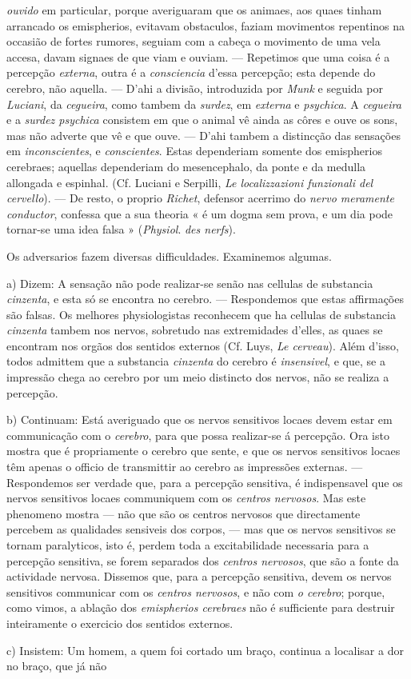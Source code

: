 \emph{ouvido} em particular, porque averiguaram que os animaes, aos quaes tinham arrancado os emispherios, evitavam obstaculos, faziam movimentos repentinos na occasião de fortes rumores, seguiam com a cabeça o movimento de uma vela accesa, davam signaes de que viam e ouviam. --- Repetimos que uma coisa é a percepção \emph{externa}, outra é a \emph{consciencia} d'essa percepção; esta depende do cerebro, não aquella. --- D'ahi a divisão, introduzida por \emph{Munk} e seguida por \emph{Luciani}, da \emph{cegueira}, como tambem da \emph{surdez}, em \emph{externa} e \emph{psychica}. A \emph{cegueira} e a \emph{surdez psychica} consistem em que o animal vê ainda as côres e ouve os sons, mas não adverte que vê e que ouve. --- D'ahi tambem a distincção das sensações em \emph{inconscientes}, e \emph{conscientes}. Estas dependeriam somente dos emispherios cerebraes; aquellas dependeriam do mesencephalo, da ponte e da medulla allongada e espinhal. (Cf. Luciani e Serpilli, \emph{Le localizzazioni funzionali del cervello}). --- De resto, o proprio \emph{Richet}, defensor acerrimo do \emph{nervo meramente conductor}, confessa que a sua theoria « é um dogma sem prova, e um dia pode tornar-se uma idea falsa » (\emph{Physiol}. \emph{des nerfs}).\par Os adversarios fazem diversas difficuldades. Examinemos algumas.\par a) Dizem: A sensação não pode realizar-se senão nas cellulas de substancia \emph{cinzenta}, e esta só se encontra no cerebro. --- Respondemos que estas affirmações são falsas. Os melhores physiologistas reconhecem que ha cellulas de substancia \emph{cinzenta} tambem nos nervos, sobretudo nas extremidades d'elles, as quaes se encontram nos orgãos dos sentidos externos (Cf. Luys, \emph{Le cerveau}). Além d'isso, todos admittem que a substancia \emph{cinzenta} do cerebro é \emph{insensivel}, e que, se a impressão chega ao cerebro por um meio distincto dos nervos, não se realiza a percepção.\par b) Continuam: Está averiguado que os nervos sensitivos locaes devem estar em communicação com o \emph{cerebro}, para que possa realizar-se á percepção. Ora isto mostra que é propriamente o cerebro que sente, e que os nervos sensitivos locaes têm apenas o officio de transmittir ao cerebro as impressões externas. --- Respondemos ser verdade que, para a percepção sensitiva, é indispensavel que os nervos sensitivos locaes communiquem com os \emph{centros nervosos}. Mas este phenomeno mostra --- não que são os centros nervosos que directamente percebem as qualidades sensiveis dos corpos, --- mas que os nervos sensitivos se tornam paralyticos, isto é, perdem toda a excitabilidade necessaria para a percepção sensitiva, se forem separados dos \emph{centros nervosos}, que são a fonte da actividade nervosa. Dissemos que, para a percepção sensitiva, devem os nervos sensitivos communicar com os \emph{centros nervosos}, e não com \emph{o cerebro}; porque, como vimos, a ablação dos \emph{emispherios cerebraes} não é sufficiente para destruir inteiramente o exercicio dos sentidos externos.\par c) Insistem: Um homem, a quem foi cortado um braço, continua a localisar a dor no braço, que já não 